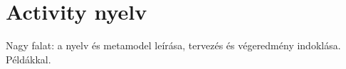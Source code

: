 \section{Activity nyelv}


Nagy falat: a nyelv és metamodel leírása, tervezés és végeredmény indoklása. Példákkal.
